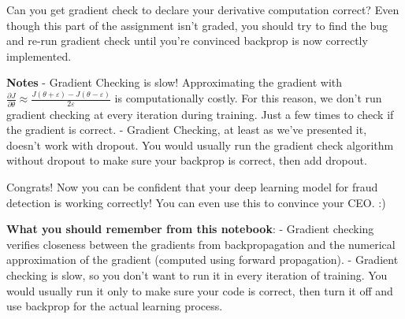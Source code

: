 \documentclass[11pt]{article}
\begin{document}
Can you get gradient check to declare your derivative computation
correct? Even though this part of the assignment isn't graded, you
should try to find the bug and re-run gradient check until you're
convinced backprop is now correctly implemented.

\textbf{Notes} - Gradient Checking is slow! Approximating the gradient
with
\(\frac{\partial J}{\partial \theta} \approx \frac{J(\theta + \varepsilon) - J(\theta - \varepsilon)}{2 \varepsilon}\)
is computationally costly. For this reason, we don't run gradient
checking at every iteration during training. Just a few times to check
if the gradient is correct. - Gradient Checking, at least as we've
presented it, doesn't work with dropout. You would usually run the
gradient check algorithm without dropout to make sure your backprop is
correct, then add dropout.

Congrats! Now you can be confident that your deep learning model for
fraud detection is working correctly! You can even use this to convince
your CEO. :)

\textbf{What you should remember from this notebook}: - Gradient
checking verifies closeness between the gradients from backpropagation
and the numerical approximation of the gradient (computed using forward
propagation). - Gradient checking is slow, so you don't want to run it
in every iteration of training. You would usually run it only to make
sure your code is correct, then turn it off and use backprop for the
actual learning process.


    
    
    
\end{document}
